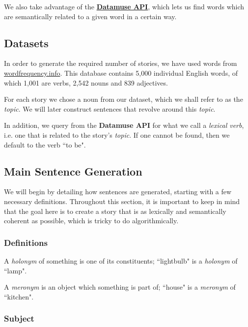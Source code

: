 We also take advantage of the \textbf{\href{https://www.datamuse.com/api/}{Datamuse API}}, which lets us find words which are semantically related to a given word in a certain way.

\subsection{Datasets}

In order to generate the required number of stories, we have used words from \href{http://www.wordfrequency.info/}{wordfrequency.info}. This database contains 5,000 individual English words, of which 1,001 are verbs, 2,542 nouns and 839 adjectives.

For each story we chose a noun from our dataset, which we shall refer to as the \textit{topic}. We will later construct sentences that revolve around this \textit{topic}.

In addition, we query from the \textbf{Datamuse API} for what we call a \textit{lexical verb}, i.e. one that is related to the story's \textit{topic}. If one cannot be found, then we default to the verb ``to be".

\subsection{Main Sentence Generation}

We will begin by detailing how sentences are generated, starting with a few necessary definitions. Throughout this section, it is important to keep in mind that the goal here is to create a story that is as lexically and semantically coherent as possible, which is tricky to do algorithmically.

\subsubsection{Definitions}

\begin{definition}[Holonym]
A \textit{holonym} of something is one of its constituents; ``lightbulb" is a \textit{holonym} of ``lamp".
\end{definition}

\begin{definition}[Meronym]
A \textit{meronym} is an object which something is part of; ``house" is a \textit{meronym} of ``kitchen".
\end{definition}

\subsubsection{Subject}

